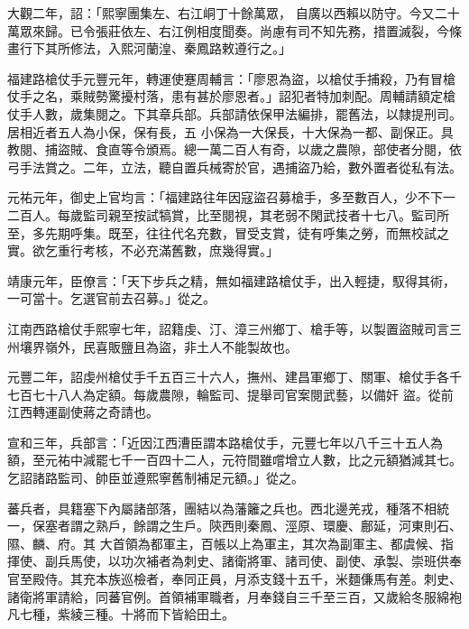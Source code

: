 \begin{pinyinscope}
 大觀二年，詔：「熙寧團集左、右江峒丁十餘萬眾，
 自廣以西賴以防守。今又二十萬眾來歸。已令張莊依左、右江例相度聞奏。尚慮有司不知先務，措置滅裂，今條畫行下其所修法，入熙河蘭湟、秦鳳路敕遵行之。」



 福建路槍仗手元豐元年，轉運使蹇周輔言：「廖恩為盜，以槍仗手捕殺，乃有冒槍仗手之名，乘賊勢驚擾村落，患有甚於廖恩者。」詔犯者特加刺配。周輔請額定槍仗手人數，歲集閱之。下其章兵部。兵部請依保甲法編排，罷舊法，以隸提刑司。居相近者五人為小保，保有長，五
 小保為一大保長，十大保為一都、副保正。具教閱、捕盜賊、食直等令頒焉。總一萬二百人有奇，以歲之農隙，部使者分閱，依弓手法賞之。二年，立法，聽自置兵械寄於官，遇捕盜乃給，數外置者從私有法。



 元祐元年，御史上官均言：「福建路往年因寇盜召募槍手，多至數百人，少不下一二百人。每歲監司親至按試犒賞，比至閱視，其老弱不閑武技者十七八。監司所至，多先期呼集。既至，往往代名充數，冒受支賞，徒有呼集之勞，而無校試之
 實。欲乞重行考核，不必充滿舊數，庶幾得實。」



 靖康元年，臣僚言：「天下步兵之精，無如福建路槍仗手，出入輕捷，馭得其術，一可當十。乞選官前去召募。」從之。



 江南西路槍仗手熙寧七年，詔籍虔、汀、漳三州鄉丁、槍手等，以製置盜賊司言三州壤界嶺外，民喜販鹽且為盜，非土人不能製故也。



 元豐二年，詔虔州槍仗手千五百三十六人，撫州、建昌軍鄉丁、關軍、槍仗手各千七百七十八人為定額。每歲農隙，輪監司、提舉司官案閱武藝，以備奸
 盜。從前江西轉運副使蔣之奇請也。



 宣和三年，兵部言：「近因江西漕臣謂本路槍仗手，元豐七年以八千三十五人為額，至元祐中減罷七千一百四十二人，元符間雖嚐增立人數，比之元額猶減其七。乞詔諸路監司、帥臣並遵熙寧舊制補足元額。」從之。



 蕃兵者，具籍塞下內屬諸部落，團結以為藩籬之兵也。西北邊羌戎，種落不相統一，保塞者謂之熟戶，餘謂之生戶。陝西則秦鳳、涇原、環慶、鄜延，河東則石、隰、麟、府。其
 大首領為都軍主，百帳以上為軍主，其次為副軍主、都虞候、指揮使、副兵馬使，以功次補者為刺史、諸衛將軍、諸司使、副使、承製、崇班供奉官至殿侍。其充本族巡檢者，奉同正員，月添支錢十五千，米麵傔馬有差。刺史、諸衛將軍請給，同蕃官例。首領補軍職者，月奉錢自三千至三百，又歲給冬服綿袍凡七種，紫綾三種。十將而下皆給田土。




\end{pinyinscope}
